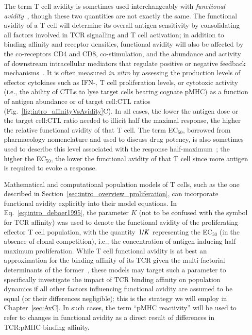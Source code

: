 The term T cell avidity is sometimes used interchangeably with \textit{functional avidity}~\cite{van2006t}, though these two quantities are not exactly the same. The functional avidity of a T cell will determine its overall antigen sensitivity by consolidating all factors involved in TCR signalling and T cell activation; in addition to binding affinity and receptor densities, functional avidity will also be affected by the co-receptors CD4 and CD8, co-stimulation, and the abundance and activity of downstream intracellular mediators that regulate positive or negative feedback mechanisms~\cite{this2021strength,james2022cd4,vigano2012functional,margulies2001tcr,slifka2001functional, viola1996t}. It is often measured \textit{in vitro} by assessing the production levels of effector cytokines such as IFN-\textgamma{}, T cell proliferation levels, or cytotoxic activity (i.e., the ability of CTLs to lyse target cells bearing cognate pMHC) as a function of antigen abundance or of target cell:CTL ratios~\cite{vigano2012functional} (Fig.~\ref{fig:intro_affinityVsAvidity}C). In all cases, the lower the antigen dose or the target cell:CTL ratio needed to illicit half the maximal response, the higher the relative functional avidity of that T cell. The term EC$_{50}$, borrowed from pharmacology nomenclature and used to discuss drug potency, is also sometimes used to describe this level associated with the response half-maximum~\cite{vigano2012functional}; the higher the EC$_{50}$, the lower the functional avidity of that T cell since more antigen is required to evoke a response.

Mathematical and computational population models of T cells, such as the one described in Section~\ref{sec:intro_overview_proliferation}, can incorporate functional avidity explicitly into their model equations. In Eq.~\eqref{eq:intro_deboer1995}, the parameter $K$ (not to be confused with the symbol for TCR affinity) was used to denote the functional avidity of the proliferating effector T cell population, with the quantity $\flatfrac{1}{K}$ representing the EC$_{50}$ (in the absence of clonal competition), i.e., the concentration of antigen inducing half-maximum proliferation. While T cell functional avidity is at best an approximation for the binding affinity of its TCR given the multi-factorial determinants of the former~\cite{margulies2001tcr}, these models may target such a parameter to specifically investigate the impact of TCR binding affinity on population dynamics if all other factors influencing functional avidity are assumed to be equal (or their differences negligible); this is the strategy we will employ in Chapter~\ref{sec:AvC}. In such cases, the term ``pMHC reactivity'' will be used to refer to changes in functional avidity as a direct result of differences in TCR:pMHC binding affinity.

